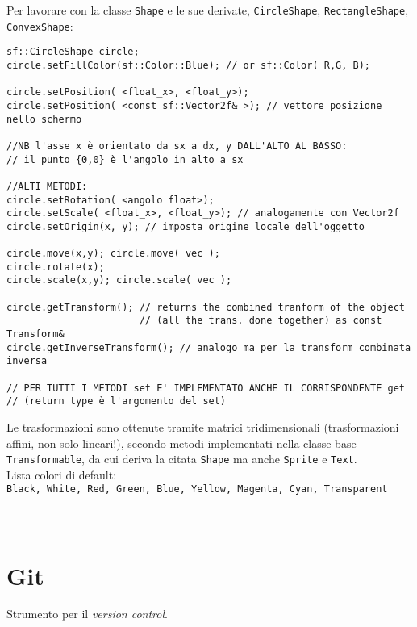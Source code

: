 \documentclass[10pt, oneside]{Book}
\begin{document}
Per lavorare con la classe \texttt{Shape} e le sue derivate, \texttt{CircleShape}, \texttt{RectangleShape}, \texttt{ConvexShape}:
\begin{verbatim}
sf::CircleShape circle;
circle.setFillColor(sf::Color::Blue); // or sf::Color( R,G, B);

circle.setPosition( <float_x>, <float_y>);
circle.setPosition( <const sf::Vector2f& >); // vettore posizione nello schermo

//NB l'asse x è orientato da sx a dx, y DALL'ALTO AL BASSO:
// il punto {0,0} è l'angolo in alto a sx

//ALTI METODI:
circle.setRotation( <angolo float>);
circle.setScale( <float_x>, <float_y>); // analogamente con Vector2f
circle.setOrigin(x, y); // imposta origine locale dell'oggetto

circle.move(x,y); circle.move( vec );
circle.rotate(x);
circle.scale(x,y); circle.scale( vec );

circle.getTransform(); // returns the combined tranform of the object
                       // (all the trans. done together) as const Transform&
circle.getInverseTransform(); // analogo ma per la transform combinata inversa

// PER TUTTI I METODI set E' IMPLEMENTATO ANCHE IL CORRISPONDENTE get 
// (return type è l'argomento del set)
\end{verbatim}
Le trasformazioni sono ottenute tramite matrici tridimensionali (trasformazioni affini, non solo lineari!), secondo metodi implementati nella classe base \texttt{Transformable}, da cui deriva la citata \texttt{Shape} ma anche \texttt{Sprite} e \texttt{Text}.
\\Lista colori di default:
\\\texttt{Black, White, Red, Green, Blue, Yellow, Magenta, Cyan, Transparent}
\\~\\ \\

\chapter{Git}
Strumento per il \textit{version control}.
\end{document}

